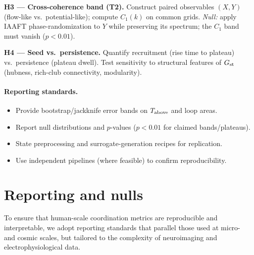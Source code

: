 \documentclass[12pt,a4paper,oneside]{scrreprt}
\begin{document}
\textbf{H3 — Cross-coherence band (T2).} 
Construct paired observables $(X,Y)$ (flow-like vs.\ potential-like); compute $C_1(k)$ on common grids. 
\emph{Null:} apply IAAFT phase-randomization to $Y$ while preserving its spectrum; the $C_1$ band must vanish ($p<0.01$).

\textbf{H4 — Seed vs.\ persistence.} 
Quantify recruitment (rise time to plateau) vs.\ persistence (plateau dwell). 
Test sensitivity to structural features of $G_{\rm st}$ (hubness, rich-club connectivity, modularity).

\paragraph{Reporting standards.} 
\begin{itemize}
\item Provide bootstrap/jackknife error bands on $T_{\rm above}$ and loop areas.
\item Report null distributions and $p$-values ($p<0.01$ for claimed bands/plateaus).
\item State preprocessing and surrogate-generation recipes for replication.
\item Use independent pipelines (where feasible) to confirm reproducibility.
\end{itemize}

\section{Reporting and nulls}\label{sec:human-report}

To ensure that human-scale coordination metrics are reproducible and interpretable, 
we adopt reporting standards that parallel those used at micro- and cosmic scales, 
but tailored to the complexity of neuroimaging and electrophysiological data.
\end{document}
